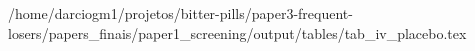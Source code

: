 /home/darciogm1/projetos/bitter-pills/paper3-frequent-losers/papers_finais/paper1_screening/output/tables/tab_iv_placebo.tex